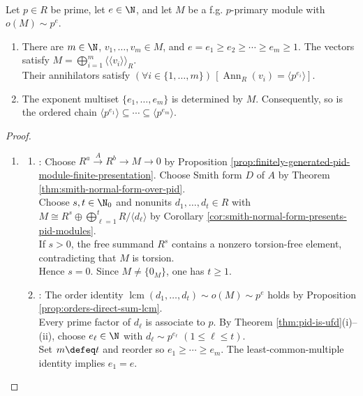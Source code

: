 \begin{theorem} \label{thm:cyclic-decomposition-primary-pid} \\
Let $p\in R$ be prime, let $e\in\N$, and let $M$ be a f.g. $p$-primary module with $o(M)\sim p^e$.
\begin{enumerate}[label=(\roman*)]
\setlength{\itemsep}{0pt}
\item There are $m\in\N$, $v_1,\ldots,v_m\in M$, and $e=e_1\geq e_2\geq\cdots\geq e_m\geq1$. The vectors satisfy $M=\bigoplus\limits_{i=1}^m\langle\!\langle v_i\rangle\!\rangle_R$.\\
Their annihilators satisfy $(\forall i\in\{1,\ldots,m\})\,[\operatorname{Ann}_R(v_i)=\langle p^{e_i}\rangle]$.
\item The exponent multiset $\{e_1,\ldots,e_m\}$ is determined by $M$. Consequently, so is the ordered chain $\langle p^{e_1}\rangle\subseteq\cdots\subseteq\langle p^{e_m}\rangle$.
\end{enumerate}
\begin{proof}
\begin{enumerate}[label=(\roman*)]
\setlength{\itemsep}{0pt}
\item
\begin{enumerate}[label=(\alph*)]
\setlength{\itemsep}{0pt}
\item {}: Choose $R^a\xrightarrow{A}R^b\to M\to0$ by Proposition \ref{prop:finitely-generated-pid-module-finite-presentation}. Choose Smith form $D$ of $A$ by Theorem \ref{thm:smith-normal-form-over-pid}.\\
Choose $s,t\in\N_0$ and nonunits $d_1,\ldots,d_t\in R$ with $M\cong R^s\oplus\bigoplus\limits_{\ell=1}^tR/\langle d_\ell\rangle$ by Corollary \ref{cor:smith-normal-form-presents-pid-modules}.\\
If $s>0$, the free summand $R^s$ contains a nonzero torsion-free element, contradicting that $M$ is torsion.\\
Hence $s=0$. Since $M\neq\{0_M\}$, one has $t\geq1$.
\item {}: The order identity $\operatorname{lcm}(d_1,\ldots,d_t)\sim o(M)\sim p^e$ holds by Proposition \ref{prop:orders-direct-sum-lcm}.\\
Every prime factor of $d_\ell$ is associate to $p$. By Theorem \ref{thm:pid-is-ufd}(i)--(ii), choose $e_\ell\in\N$ with $d_\ell\sim p^{e_\ell}$ $(1\leq\ell\leq t)$.\\
Set $m\defeq t$ and reorder so $e_1\geq\cdots\geq e_m$. The least-common-multiple identity implies $e_1=e$.

\end{enumerate}
\end{enumerate}
\end{proof}
\end{theorem}
